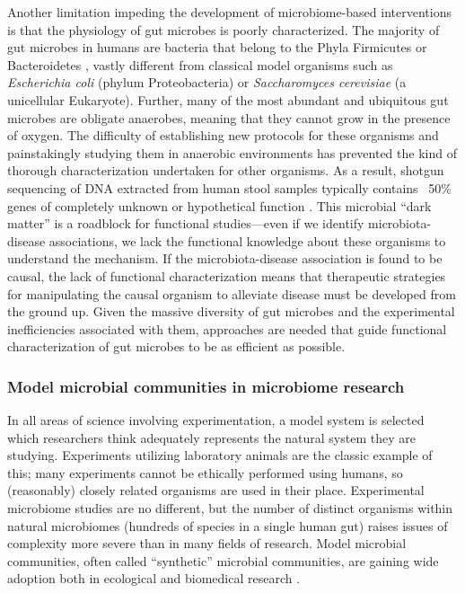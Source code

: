 \documentclass[11pt,twocolumn,notitlepage,openany,twoside]{book}
\begin{document}
\begin{refsection}
Another limitation impeding the development of microbiome-based interventions is that the physiology of gut microbes is poorly characterized. The majority of gut microbes in humans are bacteria that belong to the Phyla Firmicutes or Bacteroidetes \cite{Turnbaugh2007-cd}, vastly different from classical model organisms such as \textit{Escherichia coli} (phylum Proteobacteria) or \textit{Saccharomyces cerevisiae} (a unicellular Eukaryote). Further, many of the most abundant and ubiquitous gut microbes are obligate anaerobes, meaning that they cannot grow in the presence of oxygen. The difficulty of establishing new protocols for these organisms and painstakingly studying them in anaerobic environments has prevented the kind of thorough characterization undertaken for other organisms. As a result, shotgun sequencing of DNA extracted from human stool samples typically contains ~50\% genes of completely unknown or hypothetical function \cite{Joice2014-tp}. This microbial “dark matter” is a roadblock for functional studies---even if we identify microbiota-disease associations, we lack the functional knowledge about these organisms to understand the mechanism. If the microbiota-disease association is found to be causal, the lack of functional characterization means that therapeutic strategies for manipulating the causal organism to alleviate disease must be developed from the ground up. Given the massive diversity of gut microbes and the experimental inefficiencies associated with them, approaches are needed that guide functional characterization of gut microbes to be as efficient as possible.

\subsubsection{Model microbial communities in microbiome research}

In all areas of science involving experimentation, a model system is selected which researchers think adequately represents the natural system they are studying. Experiments utilizing laboratory animals are the classic example of this; many experiments cannot be ethically performed using humans, so (reasonably) closely related organisms are used in their place. Experimental microbiome studies are no different, but the number of distinct organisms within natural microbiomes (hundreds of species in a single human gut) raises issues of complexity more severe than in many fields of research. Model microbial communities, often called “synthetic” microbial communities, are gaining wide adoption both in ecological and biomedical research \cite{Johns2016-la}.


\end{refsection}
\end{document}
